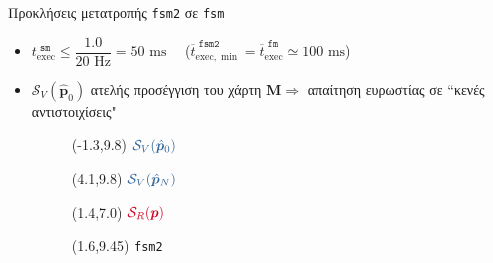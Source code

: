 \begin{frame}{Προκλήσεις μετατροπής \texttt{fsm2} σε \texttt{fsm}}


  \begin{itemize}
    \item $t_{\text{exec}}^{\texttt{\ sm}} \leq \dfrac{1.0}{20\text{ Hz}} = 50 \text{ ms}$ \ \ ($\overline{t}_{\text{exec},\min}^{\texttt{\ fsm2}} = \overline{t}_{\text{exec}}^{\texttt{\ fm}} \simeq 100 \text{ ms}$)
    \item $\mathcal{S}_V(\hat{\bm{p}}_0)$ ατελής προσέγγιση του χάρτη $\bm{M} \Rightarrow$ απαίτηση ευρωστίας σε ``\textcolor{m}{κενές αντιστοιχίσεις}"
          \vspace{0.3cm}
          \begin{figure}\centering
            \resizebox{4cm}{!}{}
            \begin{textblock}{14}(-1.3,9.8)
              $\textcolor{b}{\mathcal{S}_V(\hat{\bm{p}}_0)}$
            \end{textblock}
            \begin{textblock}{14}(4.1,9.8)
              $\textcolor{b}{\mathcal{S}_V(\hat{\bm{p}}_N)}$
            \end{textblock}
            \begin{textblock}{14}(1.4,7.0)
              $\textcolor{r}{\mathcal{S}_R(\bm{p})}$
            \end{textblock}
            \begin{textblock}{14}(1.6,9.45)
              \tiny \texttt{fsm2}
            \end{textblock}
          \end{figure}
  \end{itemize}


\end{frame}
